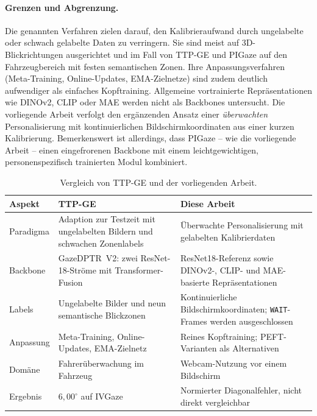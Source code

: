 \documentclass[
  11pt,
  a4paper,
  oneside,
  DIV=12,                 %
  BCOR=8mm,               %
  parskip=half,           %
  headings=normal,
  bibliography=totoc,     %
  listof=totoc            %
]{scrreprt}
\newcommand{\code}[1]{\texttt{#1}}
\begin{document}
\paragraph{Grenzen und Abgrenzung.}
Die genannten Verfahren zielen darauf, den Kalibrieraufwand durch ungelabelte oder schwach gelabelte Daten zu verringern. Sie sind meist auf 3D-Blickrichtungen ausgerichtet und im Fall von TTP-GE und PIGaze auf den Fahrzeugbereich mit festen semantischen Zonen. Ihre Anpassungsverfahren (Meta-Training, Online-Updates, EMA-Zielnetze) sind zudem deutlich aufwendiger als einfaches Kopftraining. Allgemeine vortrainierte Repräsentationen wie DINOv2, CLIP oder MAE werden nicht als Backbones untersucht. Die vorliegende Arbeit verfolgt den ergänzenden Ansatz einer \emph{überwachten} Personalisierung mit kontinuierlichen Bildschirmkoordinaten aus einer kurzen Kalibrierung. Bemerkenswert ist allerdings, dass PIGaze -- wie die vorliegende Arbeit -- einen eingefrorenen Backbone mit einem leichtgewichtigen, personenspezifisch trainierten Modul kombiniert.

\begin{table}[htbp]
  \centering
  \small
  \caption{Vergleich von TTP-GE und der vorliegenden Arbeit.}
  \label{tab:ttpge_vergleich}
  \begin{tabularx}{\textwidth}{L{3.0cm} Y Y}
    \toprule
    \textbf{Aspekt} & \textbf{TTP-GE~\cite{nagpure2025ttpge}} & \textbf{Diese Arbeit} \\
    \midrule
    Paradigma & Adaption zur Testzeit mit ungelabelten Bildern und schwachen Zonenlabels & Überwachte Personalisierung mit gelabelten Kalibrierdaten \\
    Backbone & GazeDPTR~V2: zwei ResNet-18-Ströme mit Transformer-Fusion & ResNet18-Referenz sowie DINOv2-, CLIP- und MAE-basierte Repräsentationen \\
    Labels & Ungelabelte Bilder und neun semantische Blickzonen & Kontinuierliche Bildschirmkoordinaten; \code{WAIT}-Frames werden ausgeschlossen \\
    Anpassung & Meta-Training, Online-Updates, EMA-Zielnetz & Reines Kopftraining; PEFT-Varianten als Alternativen \\
    Domäne & Fahrerüberwachung im Fahrzeug & Webcam-Nutzung vor einem Bildschirm \\
    Ergebnis & $6,00^\circ$ auf IVGaze & Normierter Diagonalfehler, nicht direkt vergleichbar \\
    \bottomrule
  \end{tabularx}
\end{table}
\end{document}
